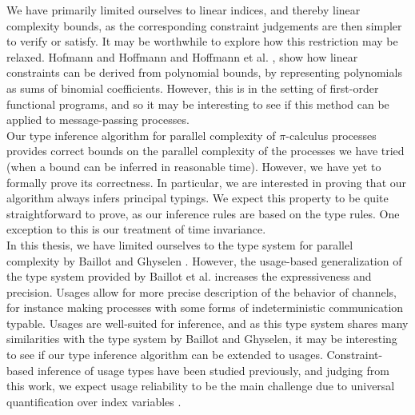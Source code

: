 We have primarily limited ourselves to linear indices, and thereby linear complexity bounds, as the corresponding constraint judgements are then simpler to verify or satisfy. It may be worthwhile to explore how this restriction may be relaxed. Hofmann and Hoffmann \cite{HofmannAndHoffmann2010} and Hoffmann et al. \cite{HoffmannEtAl2012}, show how linear constraints can be derived from polynomial bounds, by representing polynomials as sums of binomial coefficients. However, this is in the setting of first-order functional programs, and so it may be interesting to see if this method can be applied to message-passing processes.\\

Our type inference algorithm for parallel complexity of $\pi$-calculus processes provides correct bounds on the parallel complexity of the processes we have tried (when a bound can be inferred in reasonable time). However, we have yet to formally prove its correctness. In particular, we are interested in proving that our algorithm always infers principal typings. We expect this property to be quite straightforward to prove, as our inference rules are based on the type rules. One exception to this is our treatment of time invariance.\\


In this thesis, we have limited ourselves to the type system for parallel complexity by Baillot and Ghyselen \cite{BaillotGhyselen2021}. However, the usage-based generalization of the type system provided by Baillot et al. \cite{BaillotEtAl2021} increases the expressiveness and precision. Usages allow for more precise description of the behavior of channels, for instance making processes with some forms of indeterministic communication typable. Usages are well-suited for inference, and as this type system shares many similarities with the type system by Baillot and Ghyselen, it may be interesting to see if our type inference algorithm can be extended to usages. Constraint-based inference of usage types have been studied previously, and judging from this work, we expect usage reliability to be the main challenge due to universal quantification over index variables \cite{KobayashiEtAl2000, Kobayashi2005}.

